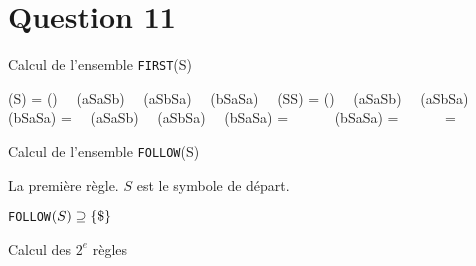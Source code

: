 \documentclass[class=article]{standalone}
\begin{document}
\section*{Question 11}

Calcul de l'ensemble \lstinline{FIRST}(S)

\begin{deriv}
    (S)
    \<=
    (\epsilon) \, \cup \,
        (aSaSb) \, \cup \,
        (aSbSa) \, \cup \,
        (bSaSa) \, \cup \,
        (SS)
    \<=
    (\epsilon) \, \cup \,
        (aSaSb) \, \cup \,
        (aSbSa) \, \cup \,
        (bSaSa)
    \<=
    \acc{\epsilon} \, \cup \,
        (aSaSb) \, \cup \,
        (aSbSa) \, \cup \,
        (bSaSa)
    \<=
    \acc{\epsilon} \, \cup \,
         \, \cup \,
         \, \cup \,
        (bSaSa)
    \<=
    \acc{\epsilon} \, \cup \,
         \, \cup \,
         \, \cup \,
    \<=
\end{deriv}

Calcul de l'ensemble \lstinline{FOLLOW}(S)

La première règle. $S$ est le symbole de départ.
\begin{center}
\lstinline{FOLLOW}$(S) \supseteq \left \{ \$ \right \}$
\end{center}

Calcul des $2^e$ règles
\end{document}
